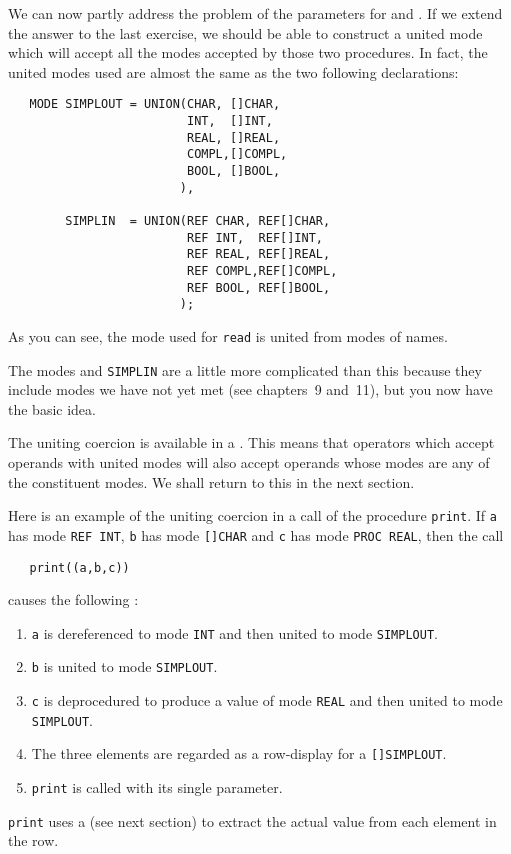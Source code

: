We can now partly address the problem of the parameters for
 and .  If we extend the answer to the last
exercise, we should be able to construct a united mode which will
accept all the modes accepted by those two procedures.  In fact, the
united modes used are almost the same as the two following
declarations:
\begin{verbatim}
   MODE SIMPLOUT = UNION(CHAR, []CHAR,
                         INT,  []INT,
                         REAL, []REAL,
                         COMPL,[]COMPL,
                         BOOL, []BOOL,
                        ),

        SIMPLIN  = UNION(REF CHAR, REF[]CHAR,
                         REF INT,  REF[]INT,
                         REF REAL, REF[]REAL,
                         REF COMPL,REF[]COMPL,
                         REF BOOL, REF[]BOOL,
                        );
\end{verbatim}
\noindent
As you can see, the mode  used for \verb|read| is
united from modes of names.

The modes  and \verb|SIMPLIN| are
a little more complicated than this because they include modes we have
not yet met (see chapters~9 and~11), but you now have the basic idea.

The uniting coercion is available in a
.  This means that operators which
accept operands with united modes will also accept operands whose
modes are any of the constituent modes.  We shall return to this in
the next section.

Here is an example of the uniting coercion in a call of the procedure
\verb|print|.  If \verb|a| has mode \verb|REF INT|, \verb|b| has mode
\verb|[]CHAR| and \verb|c| has mode \verb|PROC REAL|, then the call
\begin{verbatim}
   print((a,b,c))
\end{verbatim}
\noindent
causes the following 
:
\begin{enumerate}
\item \verb|a| is dereferenced to mode \verb|INT| and then united to
mode \verb|SIMPLOUT|.
\item \verb|b| is united to mode \verb|SIMPLOUT|.
\item \verb|c| is deprocedured to produce a value of mode \verb|REAL|
and then united to mode \verb|SIMPLOUT|.
\item The three elements are regarded as a row-display for a
\verb|[]SIMPLOUT|.
\item \verb|print| is called with its single parameter.
\end{enumerate}
\verb|print| uses a 
(see next section) to extract the actual value from each element in
the row.

